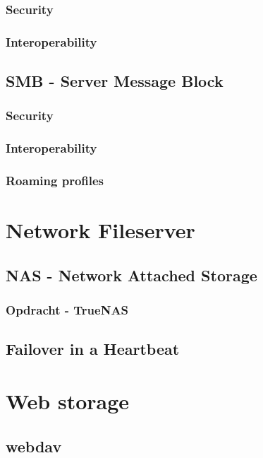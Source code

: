 \documentclass[a4paper,12pt,twoside,openright,titlepage]{book}
\begin{document}
\subsection{Security}

\subsection{Interoperability}

\section{SMB - Server Message Block}

\subsection{Security}

\subsection{Interoperability}

\subsection{Roaming profiles}

\chapter{Network Fileserver}
\section{NAS - Network Attached Storage}

\subsection{Opdracht - TrueNAS}


\section{Failover in a Heartbeat}


\chapter{Web storage}

\section{webdav}

\end{document}
